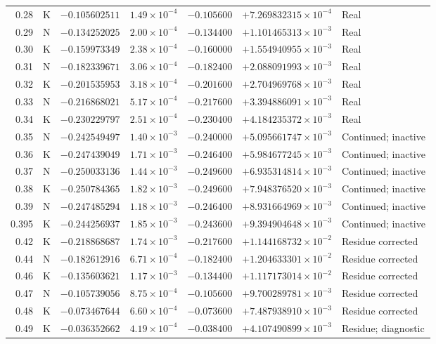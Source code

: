 \documentclass[11pt]{article}
\begin{document}
\begin{landscape}
\begin{center}
\begin{longtable}{@{}r c r r r r l@{}}
0.28 & K & $-0.105602511$ & $1.49\times10^{-4}$ & $-0.105600$ & $+7.269832315\times10^{-4}$ & Real \\
0.29 & N & $-0.134252025$ & $2.00\times10^{-4}$ & $-0.134400$ & $+1.101465313\times10^{-3}$ & Real \\
0.30 & K & $-0.159973349$ & $2.38\times10^{-4}$ & $-0.160000$ & $+1.554940955\times10^{-3}$ & Real \\
0.31 & N & $-0.182339671$ & $3.06\times10^{-4}$ & $-0.182400$ & $+2.088091993\times10^{-3}$ & Real \\
0.32 & K & $-0.201535953$ & $3.18\times10^{-4}$ & $-0.201600$ & $+2.704969768\times10^{-3}$ & Real \\
0.33 & N & $-0.216868021$ & $5.17\times10^{-4}$ & $-0.217600$ & $+3.394886091\times10^{-3}$ & Real \\
0.34 & K & $-0.230229797$ & $2.51\times10^{-4}$ & $-0.230400$ & $+4.184235372\times10^{-3}$ & Real \\
0.35 & N & $-0.242549497$ & $1.40\times10^{-3}$ & $-0.240000$ & $+5.095661747\times10^{-3}$ & Continued; inactive \\
0.36 & K & $-0.247439049$ & $1.71\times10^{-3}$ & $-0.246400$ & $+5.984677245\times10^{-3}$ & Continued; inactive \\
0.37 & N & $-0.250033136$ & $1.44\times10^{-3}$ & $-0.249600$ & $+6.935314814\times10^{-3}$ & Continued; inactive \\
0.38 & K & $-0.250784365$ & $1.82\times10^{-3}$ & $-0.249600$ & $+7.948376520\times10^{-3}$ & Continued; inactive \\
0.39 & N & $-0.247485294$ & $1.18\times10^{-3}$ & $-0.246400$ & $+8.931664969\times10^{-3}$ & Continued; inactive \\
0.395 & K & $-0.244256937$ & $1.85\times10^{-3}$ & $-0.243600$ & $+9.394904648\times10^{-3}$ & Continued; inactive \\
0.42 & K & $-0.218868687$ & $1.74\times10^{-3}$ & $-0.217600$ & $+1.144168732\times10^{-2}$ & Residue corrected \\
0.44 & N & $-0.182612916$ & $6.71\times10^{-4}$ & $-0.182400$ & $+1.204633301\times10^{-2}$ & Residue corrected \\
0.46 & K & $-0.135603621$ & $1.17\times10^{-3}$ & $-0.134400$ & $+1.117173014\times10^{-2}$ & Residue corrected \\
0.47 & N & $-0.105739056$ & $8.75\times10^{-4}$ & $-0.105600$ & $+9.700289781\times10^{-3}$ & Residue corrected \\
0.48 & K & $-0.073467644$ & $6.60\times10^{-4}$ & $-0.073600$ & $+7.487938910\times10^{-3}$ & Residue corrected \\
0.49 & K & $-0.036352662$ & $4.19\times10^{-4}$ & $-0.038400$ & $+4.107490899\times10^{-3}$ & Residue; diagnostic \\
\end{longtable}
\end{center}
\end{landscape}
\end{document}
